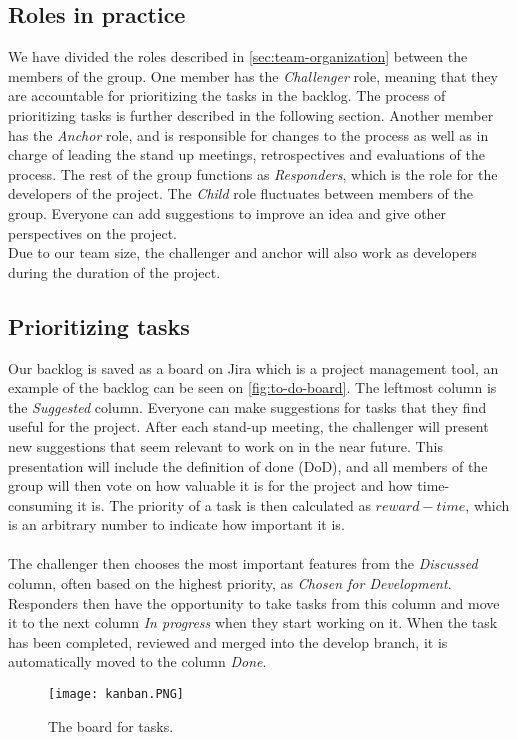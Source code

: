 \subsection{Roles in practice}
We have divided the roles described in \autoref{sec:team-organization} between the members of the group.
One member has the \textit{Challenger} role, meaning that they are accountable for prioritizing the tasks in the backlog.
The process of prioritizing tasks is further described in the following section.
Another member has the \textit{Anchor} role, and is responsible for changes to the process as well as in charge of leading the stand up meetings, retrospectives and evaluations of the process.
The rest of the group functions as \textit{Responders}, which is the role for the developers of the project.
The \textit{Child} role fluctuates between members of the group.
Everyone can add suggestions to improve an idea and give other perspectives on the project. \\
Due to our team size, the challenger and anchor will also work as developers during the duration of the project.

\subsection{Prioritizing tasks}
Our backlog is saved as a board on Jira which is a project management tool, an example of the backlog can be seen on \autoref{fig:to-do-board}.
The leftmost column is the \textit{Suggested} column.
Everyone can make suggestions for tasks that they find useful for the project.
After each stand-up meeting, the challenger will present new suggestions that seem relevant to work on in the near future.
This presentation will include the definition of done (DoD), and all members of the group will then vote on how valuable it is for the project and how time-consuming it is.
The priority of a task is then calculated as $reward - time$, which is an arbitrary number to indicate how important it is.
\\\\
The challenger then chooses the most important features from the \textit{Discussed} column, often based on the highest priority, as \textit{Chosen for Development}.
Responders then have the opportunity to take tasks from this column and move it to the next column \textit{In progress} when they start working on it.
When the task has been completed, reviewed and merged into the develop branch, it is automatically moved to the column \textit{Done}.
\begin{figure}[H]
    \centering
    \texttt{[image: kanban.PNG]}
    \caption{The board for tasks.}
    \label{fig:to-do-board}
\end{figure}

